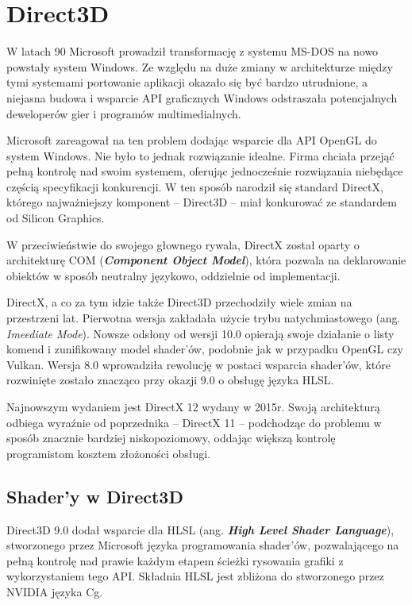 \chapter{Direct3D}

W latach 90 Microsoft prowadził transformację z systemu MS-DOS na nowo
powstały system Windows. Ze względu na duże zmiany w architekturze
między tymi systemami portowanie aplikacji okazało się być bardzo
utrudnione, a niejasna budowa i wsparcie API graficznych Windows
odstraszała potencjalnych deweloperów gier i programów multimedialnych.

Microsoft zareagował na ten problem dodając wsparcie dla API OpenGL do
system Windows. Nie było to jednak rozwiązanie idealne. Firma chciała
przejąć pełną kontrolę nad swoim systemem, oferując jednocześnie
rozwiązania niebędące częścią specyfikacji konkurencji. W ten sposób
narodził się standard DirectX, którego najważniejszy komponent --
Direct3D -- miał konkurować ze standardem od Silicon Graphics.

W przeciwieństwie do swojego głownego rywala, DirectX został oparty o
architekturę COM (\emph{\textbf{Component Object Model}}), która pozwala
na deklarowanie obiektów w sposób neutralny językowo, oddzielnie od
implementacji.

DirectX, a co za tym idzie także Direct3D przechodziły wiele zmian na
przestrzeni lat. Pierwotna wersja zakładała użycie trybu
natychmiastowego (ang. \emph{Imeediate Mode}). Nowsze odsłony od wersji
10.0 opierają swoje działanie o listy komend i zunifikowany model
shader'ów, podobnie jak w przypadku OpenGL czy Vulkan. Wersja 8.0
wprowadziła rewolucję w postaci wsparcia shader'ów, które rozwinięte
zostało znacząco przy okazji 9.0 o obsługę języka HLSL. \cite{wiki:direct3d:2024}

Najnowszym wydaniem jest DirectX 12 wydany w 2015r. Swoją architekturą
odbiega wyraźnie od poprzednika -- DirectX 11 -- podchodząc do problemu
w sposób znacznie bardziej niskopoziomowy, oddając większą kontrolę
programistom kosztem złożoności obsługi.


\section{Shader'y w Direct3D} %

Direct3D 9.0 dodał wsparcie dla HLSL (ang. \emph{\textbf{High Level
		Shader Language}}), stworzonego przez Microsoft języka programowania
shader'ów, pozwalającego na pełną kontrolę nad prawie każdym etapem
ścieżki rysowania grafiki z wykorzystaniem tego API. Składnia HLSL jest
zbliżona do stworzonego przez NVIDIA języka Cg.

